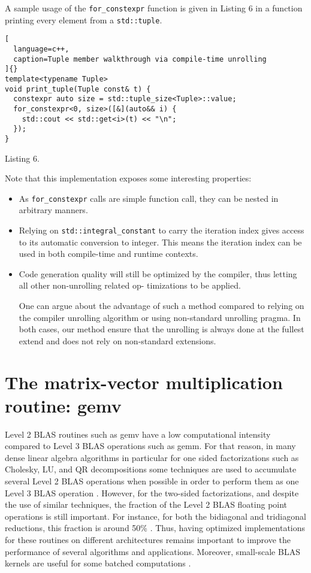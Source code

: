 \documentclass[../../main.tex]{subfiles}
\begin{document}
A sample usage of the \lstinline{for_constexpr} function is given
in Listing 6 in a function printing every element from a
\lstinline{std::tuple}.

\begin{lstlisting}[
  language=c++,
  caption=Tuple member walkthrough via compile-time unrolling
]{}
template<typename Tuple>
void print_tuple(Tuple const& t) {
  constexpr auto size = std::tuple_size<Tuple>::value;
  for_constexpr<0, size>([&](auto&& i) {
    std::cout << std::get<i>(t) << "\n";
  });
}
\end{lstlisting}
Listing 6.

Note that this implementation exposes some interesting
properties:

\begin{itemize}
\item As \lstinline{for_constexpr} calls are simple function call, they
can be nested in arbitrary manners.

\item Relying on \lstinline{std::integral_constant} to carry the
iteration index gives access to its automatic conversion
to integer. This means the iteration index can be used in
both compile-time and runtime contexts.

\item Code generation quality will still be optimized by the
compiler, thus letting all other non-unrolling related op-
timizations to be applied.

One can argue about the advantage of such a method
compared to relying on the compiler unrolling algorithm
or using non-standard unrolling pragma. In both cases, our
method ensure that the unrolling is always done at the fullest
extend and does not rely on non-standard extensions.
\end{itemize}

\section{The matrix-vector multiplication routine: gemv}

Level 2 BLAS routines such as gemv have a low
computational intensity compared to Level 3 BLAS operations
such as gemm. For that reason, in many dense linear algebra
algorithms in particular for one sided factorizations such as
Cholesky, LU, and QR decompositions some techniques are
used to accumulate several Level 2 BLAS operations when
possible in order to perform them as one Level 3 BLAS
operation \cite{hpcs18}. However, for the two-sided factorizations,
and despite the use of similar techniques, the fraction of the
Level 2 BLAS floating point operations is still important. For
instance, for both the bidiagonal and tridiagonal reductions,
this fraction is around 50\% \cite{hpcs19}. Thus, having optimized
implementations for these routines on different architectures
remains important to improve the performance of several
algorithms and applications. Moreover, small-scale BLAS
kernels are useful for some batched computations \cite{hpcs20}.
\end{document}
